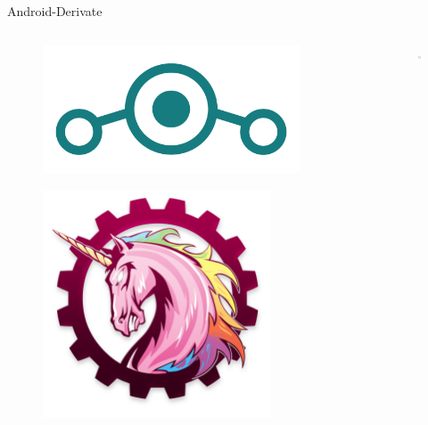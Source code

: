 \begin{frame}{Android-Derivate}
\begin{columns}
	\begin{column}{0.5\textwidth}
		\begin{figure}
			\includegraphics[width=0.9\textwidth]{resources/Lineage_OS_Logo.png}
		\end{figure}
		
		\begin{figure}
			\includegraphics[width=0.8\textwidth]{resources/aokp-logo-large.png}
		\end{figure}
		
	\end{column}
	\begin{column}{0.5\textwidth}
		
		\begin{figure}
			\includegraphics[scale=2]{resources/PA-Head.png}
		\end{figure}
		

\end{column}
\end{columns}
\end{frame}
